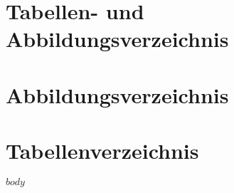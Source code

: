 \documentclass[twoside, pagesize, fontsize=11pt, dvipsnames]{scrreport} %
\begin{document}
\tableofcontents

\clearpage

\section*{Tabellen- und Abbildungsverzeichnis}


\section*{Abbildungsverzeichnis}
\label{sec:Abbildungsverzeichnis}

\listoffigures

\section*{Tabellenverzeichnis}
\label{sec:tabellenverzeichnis}

\listoftables

\cleardoublepage




$body$



\end{document}
